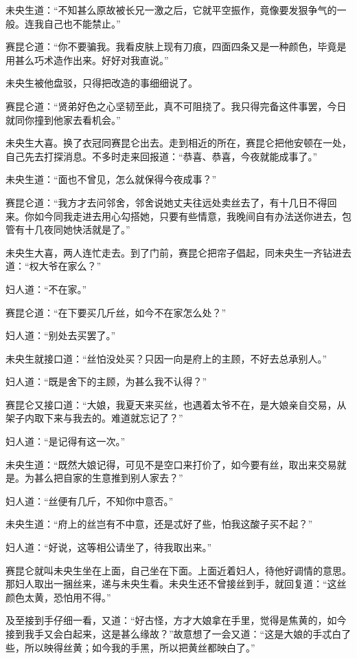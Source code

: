 \documentclass[a4paper,12pt,UTF8,twoside]{ctexbook}
\begin{document}
未央生道：“不知甚么原故被长兄一激之后，它就平空振作，竟像要发狠争气的一般。连我自己也不能禁止。”

赛昆仑道：“你不要骗我。我看皮肤上现有刀痕，四面四条又是一种颜色，毕竟是用甚么巧术造作出来。好好对我直说。”

未央生被他盘驳，只得把改造的事细细说了。

赛昆仑道：“贤弟好色之心坚韧至此，真不可阻挠了。我只得完备这件事罢，今日就同你撞到他家去看机会。”

未央生大喜。换了衣冠同赛昆仑出去。走到相近的所在，赛昆仑把他安顿在一处，自己先去打探消息。不多时走来回报道：“恭喜、恭喜，今夜就能成事了。”

未央生道：“面也不曾见，怎么就保得今夜成事？”

赛昆仑道：“我方才去问邻舍，邻舍说她丈夫往远处卖丝去了，有十几日不得回来。你如今同我走进去用心勾搭她，只要有些情意，我晚间自有办法送你进去，包管有十几夜同她快活就是了。”

未央生大喜，两人连忙走去。到了门前，赛昆仑把帘子倡起，同未央生一齐钻进去道：“权大爷在家么？”

妇人道：“不在家。”

赛昆仑道：“在下要买几斤丝，如今不在家怎么处？”

妇人道：“别处去买罢了。”

未央生就接口道：“丝怕没处买？只因一向是府上的主顾，不好去总承别人。”

妇人道：“既是舍下的主顾，为甚么我不认得？”

赛昆仑又接口道：“大娘，我夏天来买丝，也遇着太爷不在，是大娘亲自交易，从架子内取下来与我去的。难道就忘记了？”

妇人道：“是记得有这一次。”

未央生道：“既然大娘记得，可见不是空口来打价了，如今要有丝，取出来交易就是。为甚么把自家的生意推到别人家去？”

妇人道：“丝便有几斤，不知你中意否。”

未央生道：“府上的丝岂有不中意，还是忒好了些，怕我这酸子买不起？”

妇人道：“好说，这等相公请坐了，待我取出来。”

赛昆仑就叫未央生坐在上面，自己坐在下面。上面近着妇人，待他好调情的意思。那妇人取出一捆丝来，递与未央生看。未央生还不曾接丝到手，就回复道：“这丝颜色太黄，恐怕用不得。”

及至接到手仔细一看，又道：“好古怪，方才大娘拿在手里，觉得是焦黄的，如今接到我手又会白起来，这是甚么缘故？”故意想了一会又道：“这是大娘的手忒白了些，所以映得丝黄；如今我的手黑，所以把黄丝都映白了。”
\end{document}
